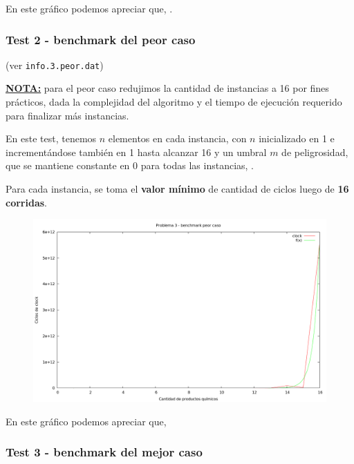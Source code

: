 En este gráfico podemos apreciar que, .


\newpage
\subsubsection{Test 2 - benchmark del peor caso}

(ver \verb|info.3.peor.dat|) \medskip

\underline{\textbf{NOTA:}} para el peor caso redujimos la cantidad de instancias a 16 por fines prácticos, dada la complejidad
del algoritmo y el tiempo de ejecución requerido para finalizar más instancias. \medskip

En este test, tenemos $n$ elementos en cada instancia, con $n$ inicializado en 1 e incrementándose
también en 1 hasta alcanzar 16 y un umbral $m$ de peligrosidad, que se mantiene constante en 0 para todas las
instancias, .

Para cada instancia, se toma el \textbf{valor mínimo} de cantidad de ciclos luego de \textbf{16 corridas}.

\vspace*{0.5cm}

\begin{figure}[h]
  \begin{center}
    \includegraphics[scale=0.35]{imagenes/grafico-3-peor.png}
  \end{center}
\end{figure}

\vspace*{0.5cm}

En este gráfico podemos apreciar que,


\newpage
\subsubsection{Test 3 - benchmark del mejor caso}

